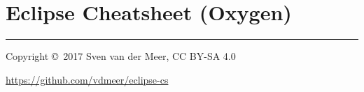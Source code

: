 \documentclass[10pt,a4paper,final,notitlepage]{article}
\begin{document}
	\setlength{\columnseprule}{0.25pt}

	\section{Eclipse Cheatsheet (Oxygen)}

		\begin{multicols}{3}
			\raggedright
			\footnotesize

			\setlength{\columnseprule}{0.25pt}
			\setlength{\premulticols}{1pt}
			\setlength{\postmulticols}{1pt}
			\setlength{\multicolsep}{1pt}
			\setlength{\columnsep}{2pt}
			\raggedcolumns

			
			
			
			
			
			
			
			
			
			
			

			\rule{0.3\linewidth}{0.25pt}
			\scriptsize

			Copyright \copyright\ 2017 Sven van der Meer, CC BY-SA 4.0

			\url{https://github.com/vdmeer/eclipse-cs}

		\end{multicols}
\end{document}
